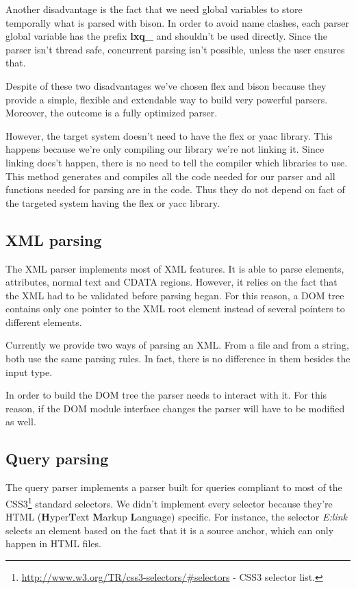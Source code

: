 \documentclass[a4paper]{report}
\begin{document}
	Another disadvantage is the fact that we need global variables to store temporally what is parsed with bison. In order to avoid name clashes, each parser global variable has the prefix \textbf{lxq\_} and shouldn't be used 
	directly. Since the parser isn't thread safe, concurrent parsing isn't possible, unless the user ensures that.
	
	Despite of these two disadvantages we've chosen flex and bison because they provide a simple, flexible and extendable way to build very powerful parsers. Moreover, the outcome is a fully optimized parser.
	
	However, the target system doesn't need to have the flex or yaac library. This happens because we're only compiling our library we're not linking it. Since linking does't happen, there is no need to tell the compiler which 
	libraries to use. This method generates and compiles all the code needed for our parser and all functions needed for parsing are in the code. Thus they do not depend on fact of the targeted system having the flex or yacc 
	library.

	\subsection{XML parsing}
		The XML parser implements most of XML features. It is able to parse elements, attributes, normal text and CDATA regions. However, it relies on the fact that the XML had to be validated before parsing began. For this 
		reason, a DOM tree contains only one pointer to the XML root element instead of several pointers to different elements.
	
		Currently we provide two ways of parsing an XML. From a file and from a string, both use the same parsing rules. In fact, there is no difference in them besides the input type.
		
		In order to build the DOM tree the parser needs to interact with it. For this reason, if the DOM module interface changes the parser will have to be modified as well.
	
	\subsection{Query parsing}	
		The query parser implements a parser built for queries compliant to most of the CSS3\footnote{\url{http://www.w3.org/TR/css3-selectors/\#selectors} - CSS3 selector list.} standard selectors. We didn't implement every
		selector because they're HTML (\textbf{H}yper\textbf{T}ext \textbf{M}arkup \textbf{L}anguage) specific. For instance, the selector \emph{E:link} selects an element based on the fact that it is a source anchor, which can 
		only happen in HTML files. 
	
\end{document}
